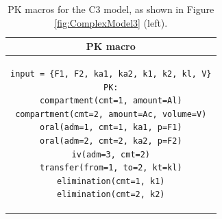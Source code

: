 \begin{table}[ht!]
\setlength{\tabcolsep}{15pt}
\begin{center}
\begin{tabular}{c}
  \hline \hline
PK macro  \\[-.25ex]
  \hline
\lstset{language=NONMEMdataSet}
\begin{lstlisting}
input = {F1, F2, ka1, ka2, k1, k2, kl, V}
PK:
compartment(cmt=1, amount=Al)
compartment(cmt=2, amount=Ac, volume=V)
oral(adm=1, cmt=1, ka1, p=F1)
oral(adm=2, cmt=2, ka2, p=F2)
iv(adm=3, cmt=2)
transfer(from=1, to=2, kt=kl)
elimination(cmt=1, k1)
elimination(cmt=2, k2)
\end{lstlisting}
\\
  \hline
\end{tabular}
\caption{PK macros  for the C3 model, as shown in Figure \ref{fig:ComplexModel3} (left).}
\label{tab:C2Table}
\end{center}
\end{table}


